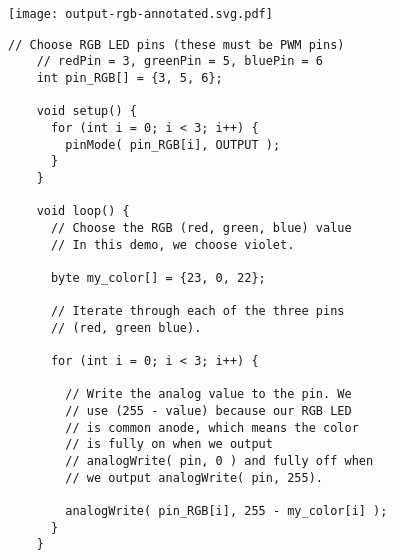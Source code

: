 \vspace{0.1in}
\begin{minipage}[t]{0.49\tw}
  \vspace{0pt}

  \texttt{[image: output-rgb-annotated.svg.pdf]}
\end{minipage}
\hfill
\begin{minipage}[t]{0.49\tw}
  \vspace{0.1in}
  \begin{Verbatim}[gobble=3,fontsize=\small]
    // Choose RGB LED pins (these must be PWM pins)
    // redPin = 3, greenPin = 5, bluePin = 6
    int pin_RGB[] = {3, 5, 6};

    void setup() {
      for (int i = 0; i < 3; i++) {
        pinMode( pin_RGB[i], OUTPUT );
      }
    }

    void loop() {
      // Choose the RGB (red, green, blue) value
      // In this demo, we choose violet.

      byte my_color[] = {23, 0, 22};

      // Iterate through each of the three pins
      // (red, green blue).

      for (int i = 0; i < 3; i++) {

        // Write the analog value to the pin. We
        // use (255 - value) because our RGB LED
        // is common anode, which means the color
        // is fully on when we output
        // analogWrite( pin, 0 ) and fully off when
        // we output analogWrite( pin, 255).

        analogWrite( pin_RGB[i], 255 - my_color[i] );
      }
    }
  \end{Verbatim}
\end{minipage}
\vspace{0.1in}

